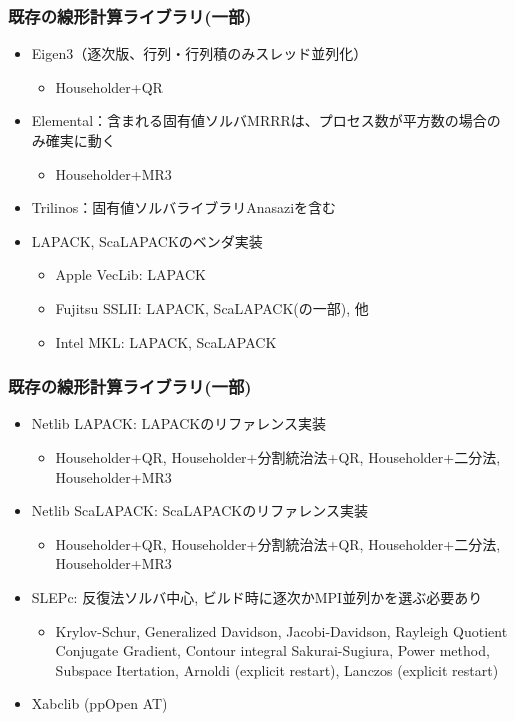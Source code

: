 \begin{frame}
  \frametitle{既存の線形計算ライブラリ(一部)}
  \begin{itemize}
  \item Eigen3（逐次版、行列・行列積のみスレッド並列化）
    \begin{itemize}
      \item Householder+QR
    \end{itemize}
  \item Elemental：含まれる固有値ソルバMRRRは、プロセス数が平方数の場合のみ確実に動く
    \begin{itemize}
      \item Householder+MR3
    \end{itemize}
  \item Trilinos：固有値ソルバライブラリAnasaziを含む
  \item LAPACK, ScaLAPACKのベンダ実装
    \begin{itemize}
    \item Apple VecLib: LAPACK
    \item Fujitsu SSLII: LAPACK, ScaLAPACK(の一部), 他
    \item Intel MKL: LAPACK, ScaLAPACK
    \end{itemize}
  \end{itemize}
\end{frame}

\begin{frame}
  \frametitle{既存の線形計算ライブラリ(一部)}
  \begin{itemize}
  \item Netlib LAPACK: LAPACKのリファレンス実装
    \begin{itemize}
      \item Householder+QR, Householder+分割統治法+QR, Householder+二分法, Householder+MR3
    \end{itemize}
  \item Netlib ScaLAPACK: ScaLAPACKのリファレンス実装
    \begin{itemize}
      \item Householder+QR, Householder+分割統治法+QR, Householder+二分法, Householder+MR3
    \end{itemize}
  \item SLEPc: 反復法ソルバ中心, ビルド時に逐次かMPI並列かを選ぶ必要あり
    \begin{itemize}
      \item Krylov-Schur, Generalized Davidson, Jacobi-Davidson, Rayleigh Quotient Conjugate Gradient, Contour integral Sakurai-Sugiura, Power method, Subspace Itertation, Arnoldi (explicit restart), Lanczos (explicit restart) \\
    \end{itemize}
  \item Xabclib (ppOpen AT)
  \end{itemize}
\end{frame}

